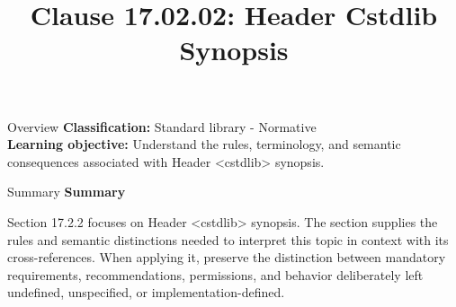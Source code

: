 \documentclass[10pt,letterpaper]{article}
\title{Clause 17.02.02: Header Cstdlib Synopsis}
\author{}
\date{}
\begin{document}
\maketitle
\begin{CornellOverviewBox}{Overview}
\textbf{Classification:} Standard library - Normative\\[2pt]
\textbf{Learning objective:} Understand the rules, terminology, and semantic consequences associated with Header <cstdlib> synopsis.
\end{CornellOverviewBox}\begin{CornellSummaryBox}{Summary}
{\sffamily\bfseries\color{Accent} Summary}\par\vspace{3pt}Section 17.2.2 focuses on Header <cstdlib> synopsis. The section supplies the rules and semantic distinctions needed to interpret this topic in context with its cross-references. When applying it, preserve the distinction between mandatory requirements, recommendations, permissions, and behavior deliberately left undefined, unspecified, or implementation-defined.
\end{CornellSummaryBox}
\end{document}
